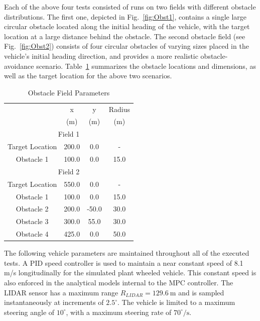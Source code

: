 \documentclass[12pt,onecolumn]{article}
\newcommand{\CHRONO}{{\sffamily{{Chrono}}}}
\begin{document}
Each of the above four tests consisted of runs on two fields with different obstacle distributions. 
The first one, depicted in Fig.~\ref{fig:Obst1}, contains a single large circular obstacle located along the initial heading of the vehicle, with the target location at a large distance behind the obstacle. 
The second obstacle field (see Fig.~\ref{fig:Obst2}) consists of four circular obstacles of varying sizes placed in the vehicle's initial heading direction, and provides a more realistic obstacle-avoidance scenario.
Table~\ref{t:ObstSummary} summarizes the obstacle locations and dimensions, as well as the target location for the above two scenarios.

\begin{table}
	\begin{center}
		\begin{tabular}{||c|c|c|c||} 
			
			\hline
			& x & y & Radius\\
			& (m) & (m) & (m)\\
			\hline\hline
			\multicolumn{4}{||c||}{Field 1} \\
			\hline
			Target Location  & 200.0 & 0.0 & -\\ 
			\hline
			Obstacle 1 & 100.0 & 0.0 & 15.0\\			
			\hline\hline
			\multicolumn{4}{||c||}{Field 2} \\
			\hline
			Target Location  & 550.0 & 0.0 & -\\ 
			\hline
			Obstacle 1 & 100.0 & 0.0 & 15.0\\
			\hline
			Obstacle 2 & 200.0 & -50.0 & 30.0\\
			\hline
			Obstacle 3 & 300.0 & 55.0 & 30.0\\
			\hline
			Obstacle 4 & 425.0 & 0.0 & 50.0\\
			\hline
		\end{tabular}
	\end{center}
	\caption{Obstacle Field Parameters}
	\label{t:ObstSummary}
\end{table}

The following vehicle parameters are maintained throughout all of the executed tests. A PID speed controller is used to maintain a near constant speed of 8.1 m/s longitudinally for the simulated plant {\CHRONO} wheeled vehicle. This constant speed is also enforced in the analytical models internal to the MPC controller. The LIDAR sensor has a maximum range $R_{LIDAR} = 129.6~\text{m}$ and is sampled instantaneously at increments of $2.5^\circ$. The vehicle is limited to a maximum steering angle of $10^\circ$, with a maximum steering rate of $70^{\circ}/\text{s}$. 
\end{document}
